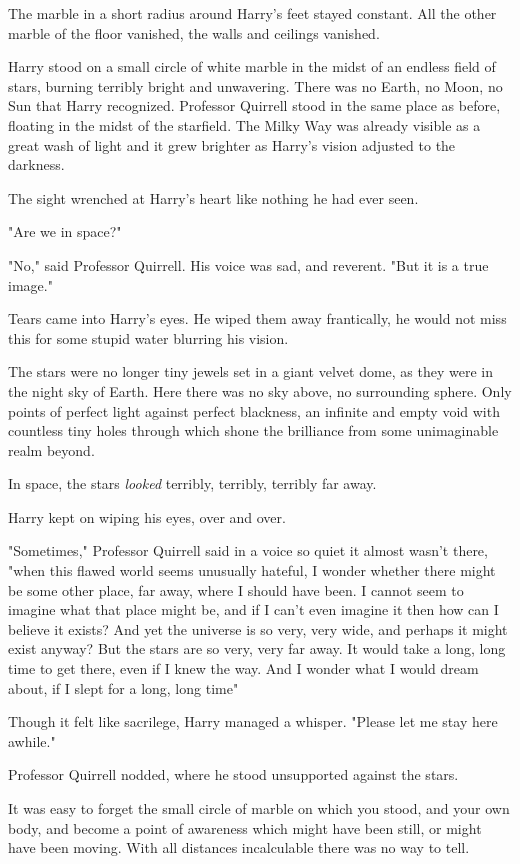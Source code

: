 The marble in a short radius around Harry's feet stayed constant. All the other
marble of the floor vanished, the walls and ceilings vanished.

Harry stood on a small circle of white marble in the midst of an endless field
of stars, burning terribly bright and unwavering. There was no Earth, no Moon,
no Sun that Harry recognized. Professor Quirrell stood in the same place as
before, floating in the midst of the starfield. The Milky Way was already
visible as a great wash of light and it grew brighter as Harry's vision
adjusted to the darkness.

The sight wrenched at Harry's heart like nothing he had ever seen.

"Are we{\el} in space\el?"

"No," said Professor Quirrell. His voice was sad, and reverent. "But it is a
true image."

Tears came into Harry's eyes. He wiped them away frantically, he would not miss
this for some stupid water blurring his vision.

The stars were no longer tiny jewels set in a giant velvet dome, as they were
in the night sky of Earth. Here there was no sky above, no surrounding sphere.
Only points of perfect light against perfect blackness, an infinite and empty
void with countless tiny holes through which shone the brilliance from some
unimaginable realm beyond.

In space, the stars \emph{looked} terribly, terribly, terribly far away.

Harry kept on wiping his eyes, over and over.

"Sometimes," Professor Quirrell said in a voice so quiet it almost wasn't
there, "when this flawed world seems unusually hateful, I wonder whether there
might be some other place, far away, where I should have been. I cannot seem to
imagine what that place might be, and if I can't even imagine it then how can I
believe it exists? And yet the universe is so very, very wide, and perhaps it
might exist anyway? But the stars are so very, very far away. It would take a
long, long time to get there, even if I knew the way. And I wonder what I would
dream about, if I slept for a long, long time{\el}"

Though it felt like sacrilege, Harry managed a whisper. "Please let me stay
here awhile."

Professor Quirrell nodded, where he stood unsupported against the stars.

It was easy to forget the small circle of marble on which you stood, and your
own body, and become a point of awareness which might have been still, or might
have been moving. With all distances incalculable there was no way to tell.

